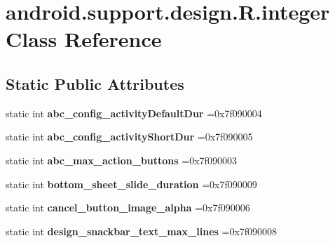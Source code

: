 \hypertarget{classandroid_1_1support_1_1design_1_1R_1_1integer}{}\section{android.\+support.\+design.\+R.\+integer Class Reference}
\label{classandroid_1_1support_1_1design_1_1R_1_1integer}
\subsection*{Static Public Attributes}
\begin{DoxyCompactItemize}
\item 
\mbox{\label{classandroid_1_1support_1_1design_1_1R_1_1integer_ae03f2352ef7341e2b0907f93f6a949ad}} 
static int {\bfseries abc\+\_\+config\+\_\+activity\+Default\+Dur} =0x7f090004
\item 
\mbox{\label{classandroid_1_1support_1_1design_1_1R_1_1integer_a817ddbda3e9b2d4121103f868cdbb495}} 
static int {\bfseries abc\+\_\+config\+\_\+activity\+Short\+Dur} =0x7f090005
\item 
\mbox{\label{classandroid_1_1support_1_1design_1_1R_1_1integer_afd0067087537d922612fb635bc5a0ed3}} 
static int {\bfseries abc\+\_\+max\+\_\+action\+\_\+buttons} =0x7f090003
\item 
\mbox{\label{classandroid_1_1support_1_1design_1_1R_1_1integer_afbd41d7c0346a27ec0094b386c897193}} 
static int {\bfseries bottom\+\_\+sheet\+\_\+slide\+\_\+duration} =0x7f090009
\item 
\mbox{\label{classandroid_1_1support_1_1design_1_1R_1_1integer_adda364f43327b1e348fb53a48019b3ce}} 
static int {\bfseries cancel\+\_\+button\+\_\+image\+\_\+alpha} =0x7f090006
\item 
\mbox{\label{classandroid_1_1support_1_1design_1_1R_1_1integer_aeea05fe2f5b1ad296f4254dac97f75f5}} 
static int {\bfseries design\+\_\+snackbar\+\_\+text\+\_\+max\+\_\+lines} =0x7f090008

\end{DoxyCompactItemize}
